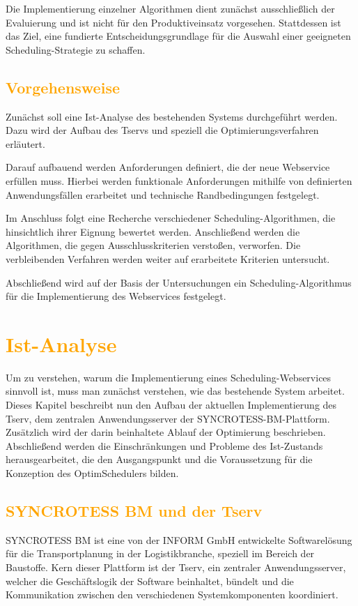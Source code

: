 \documentclass[
    12pt,               
    a4paper,            
    ngerman,            
    parskip=half,       
    headings=normal,   
    numbers=enddot,     
    toc=chapterentrywithdots 
]{scrreprt}\usepackage[utf8]{inputenc}
\begin{document}
Die Implementierung einzelner Algorithmen dient zunächst ausschließlich der Evaluierung und ist nicht für den Produktiveinsatz vorgesehen. Stattdessen ist das Ziel, eine fundierte Entscheidungsgrundlage für die Auswahl einer geeigneten Scheduling-Strategie zu schaffen.

\section{\textcolor{orange}{Vorgehensweise}}

Zunächst soll eine Ist-Analyse des bestehenden Systems durchgeführt werden. Dazu wird der Aufbau des Tservs und speziell die Optimierungsverfahren erläutert. 

Darauf aufbauend werden Anforderungen definiert, die der neue Webservice erfüllen muss. Hierbei werden funktionale Anforderungen mithilfe von definierten Anwendungsfällen erarbeitet und technische Randbedingungen festgelegt.

Im Anschluss folgt eine Recherche verschiedener Scheduling-Algorithmen, die hinsichtlich ihrer Eignung bewertet werden. Anschließend werden die Algorithmen, die gegen Ausschlusskriterien verstoßen, verworfen. Die verbleibenden Verfahren werden weiter auf erarbeitete Kriterien untersucht.

Abschließend wird auf der Basis der Untersuchungen ein Scheduling-Algorithmus für die Implementierung des Webservices festgelegt.

\chapter{\textcolor{orange}{Ist-Analyse}}
Um zu verstehen, warum die Implementierung eines Scheduling-Webservices sinnvoll ist, muss man zunächst verstehen, wie das bestehende System arbeitet. Dieses Kapitel beschreibt nun den Aufbau der aktuellen Implementierung des Tserv, dem zentralen Anwendungsserver der SYNCROTESS-BM-Plattform. Zusätzlich wird der darin beinhaltete Ablauf der Optimierung beschrieben. Abschließend werden die Einschränkungen und Probleme des Ist-Zustands herausgearbeitet, die den Ausgangspunkt und die Voraussetzung für die Konzeption des OptimSchedulers bilden.

\section{\textcolor{orange}{SYNCROTESS BM und der Tserv}}
SYNCROTESS BM ist eine von der INFORM GmbH entwickelte Softwarelösung für die Transportplanung in der Logistikbranche, speziell im Bereich der Baustoffe. Kern dieser Plattform ist der Tserv, ein zentraler Anwendungsserver, welcher die Geschäftslogik der Software beinhaltet, bündelt und die Kommunikation zwischen den verschiedenen Systemkomponenten koordiniert.
\end{document}
